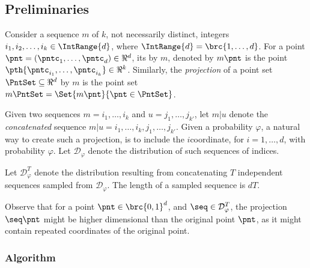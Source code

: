 \subsection{Preliminaries}

\newcommand{\subseq}{{{m}}}%
\newcommand{\subseqA}{{{u}}}%
\newcommand{\pr}{\varphi}%


\begin{defn}
    Consider a sequence $\subseq$ of $k$, not necessarily distinct,
    integers $i_1, i_2, \ldots, i_k \in \IntRange{d}$, where
    $\IntRange{d} = \brc{1, \ldots, d}$.  For a point
    $\pnt = (\pntc_1, \ldots, \pntc_d) \in \Re^d$, its
     by $\subseq$, denoted by $\subseq \pnt$ is the
    point $\pth{ \pntc_{i_1}, \ldots, \pntc_{i_k}} \in \Re^k$.
    Similarly, the \emph{projection} of a point set
    $\PntSet \subseteq \Re^d$ by $\subseq$ is the point set
    $\subseq \PntSet = \Set{\subseq \pnt}{\pnt \in \PntSet}$.
\end{defn}

\newcommand{\DistD}[1]{\mathcal{D}_{#1}}

Given two sequences $\subseq = i^{}_1, \ldots, i^{}_k$ and
$\subseqA = j^{}_1, \ldots, j^{}_{k'}$, let $\subseq | \subseqA$
denote the \emph{concatenated} sequence
\begin{math}
    \subseq | \subseqA = i^{}_1, \ldots, i^{}_k, j^{}_1, \ldots,
    j^{}_{k'}.
\end{math}
Given a probability $\pr$, a natural way to create such a projection,
is to include the $i$\th coordinate, for $i=1,\ldots, d$, with
probability $\pr$. Let $\DistD{\pr}$ denote the distribution of such
sequences of indices.


\newcommand{\tTimes}{T}%

\begin{defn}
    Let $\DistD{\pr}^\tTimes$ denote the distribution resulting from
    concatenating $T$ independent sequences sampled from
    $\DistD{\pr}$. The length of a sampled sequence is $d \tTimes$.
\end{defn}

Observe that for a point $\pnt \in \brc{0,1}^d$, and
$\seq \in \DistD{\pr}^\tTimes$, the projection $\seq \pnt$ might be
higher dimensional than the original point $\pnt$, as it might contain
repeated coordinates of the original point.



\subsubsection{Algorithm}

